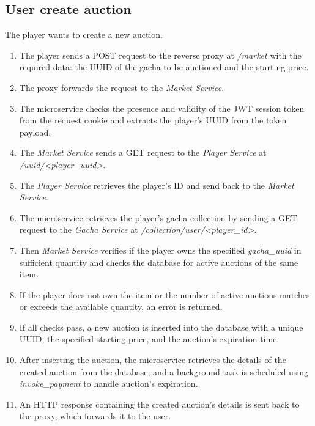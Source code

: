 \documentclass{article}
\begin{document}
\subsection{User create auction}
The player wants to create a new auction.
\begin{enumerate}
    \item The player sends a POST request to the reverse proxy at \emph{/market} with the required data: the UUID of the gacha to be auctioned and the starting price.
    \item The proxy forwards the request to the \emph{Market Service}.
    \item The microservice checks the presence and validity of the JWT session token from the request cookie and extracts the player's UUID from the token payload.
    \item The \emph{Market Service} sends a GET request to the \emph{Player Service} at \emph{/uuid/<player\_uuid>}. 
    \item The \emph{Player Service} retrieves the player's ID and send back to the \emph{Market Service}.
    \item The microservice retrieves the player's gacha collection by sending a GET request to the \emph{Gacha Service} at \emph{/collection/user/<player\_id>}.
    \item Then \emph{Market Service} verifies if the player owns the specified \emph{gacha\_uuid} in sufficient quantity and checks the database for active auctions of the same item.
    \item If the player does not own the item or the number of active auctions matches or exceeds the available quantity, an error is returned.
    \item If all checks pass, a new auction is inserted into the database with a unique UUID, the specified starting price, and the auction's expiration time.
    \item After inserting the auction, the microservice retrieves the details of the created auction from the database, and a background task is scheduled using \emph{invoke\_payment} to handle auction's expiration.
    \item An HTTP response containing the created auction's details is sent back to the proxy, which forwards it to the user.
\end{enumerate}
\end{document}
